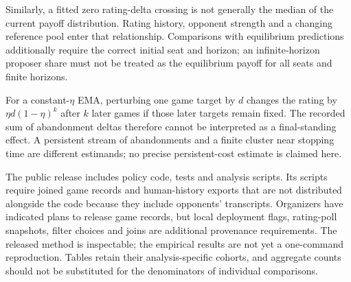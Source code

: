 \documentclass{article}
\begin{document}
Similarly, a fitted zero rating-delta crossing is not generally the median of
the current payoff distribution. Rating history, opponent strength and a
changing reference pool enter that relationship. Comparisons with equilibrium
predictions additionally require the correct initial seat and horizon; an
infinite-horizon proposer share must not be treated as the equilibrium payoff
for all seats and finite horizons.

For a constant-$\eta$ EMA, perturbing one game target by $d$ changes the rating
by $\eta d(1-\eta)^k$ after $k$ later games if those later targets remain fixed.
The recorded sum of abandonment deltas therefore cannot be interpreted as a
final-standing effect. A persistent stream of abandonments and a finite cluster
near stopping time are different estimands; no precise persistent-cost estimate
is claimed here.

The public release includes policy code, tests and analysis scripts. Its scripts
require joined game records and human-history exports that are not distributed
alongside the code because they include opponents' transcripts. Organizers have
indicated plans to release game records, but local deployment flags, rating-poll
snapshots, filter choices and joins are additional provenance requirements.
The released method is inspectable; the empirical results are not yet a
one-command reproduction. Tables retain their analysis-specific cohorts, and
aggregate counts should not be substituted for the denominators of individual
comparisons.
\end{document}
